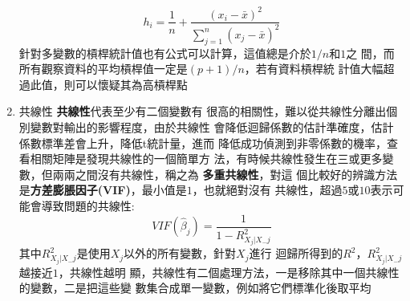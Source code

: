 \documentclass{report} %
\begin{document}
\begin{enumerate}
        \begin{equation}
          h_i = \frac{1}{n} + \frac{(x_i - \bar{x}) ^ 2}{\sum_{j =
            1} ^ {n}(x_j - \bar{x}) ^ 2}
        \end{equation}
        針對多變數的槓桿統計值也有公式可以計算，這值總是介於$1 / n$和$1$之
          間，而所有觀察資料的平均槓桿值一定是$(p + 1) / n$，若有資料槓桿統
          計值大幅超過此值，則可以懷疑其為高槓桿點
      \item 共線性
        {\bf 共線性}代表至少有二個變數有
          很高的相關性，難以從共線性分離出個別變數對輸出的影響程度，由於共線性
          會降低迴歸係數的估計準確度，估計係數標準差會上升，降低t統計量，進而
          降低成功偵測到非零係數的機率，查看相關矩陣是發現共線性的一個簡單方
          法，有時候共線性發生在三或更多變數，但兩兩之間沒有共線性，稱之為
          {\bf 多重共線性}，對這
          個比較好的辨識方法是{\bf 方差膨脹因子(VIF)}，最小值是$1$，也就絕對沒有
          共線性，超過$5$或$10$表示可能會導致問題的共線性:
        \begin{equation}
          VIF(\hat{\beta}_j) = \frac{1}{1 - R_{X_j | X_-j} ^ 2}
        \end{equation}
        其中$R_{X_j | X_-j} ^ 2$是使用$X_j$以外的所有變數，針對$X_j$進行
          迴歸所得到的$R ^ 2$，$R_{X_j | X_-j} ^ 2$越接近$1$，共線性越明
          顯，共線性有二個處理方法，一是移除其中一個共線性的變數，二是把這些變
          數集合成單一變數，例如將它們標準化後取平均
    \end{enumerate}
\end{document}
